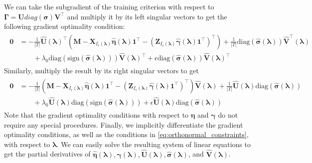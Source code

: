 \documentclass[12pt,letterpaper]{article}
\begin{document}
We can take the subgradient of the training criterion with respect to $\boldsymbol{\Gamma} = \boldsymbol{U} diag(\boldsymbol{\sigma}) \boldsymbol{V}^\top$ and multiply it by its left singular vectors to get the following gradient optimality condition:
\begin{align}
\begin{split}
\boldsymbol{0} & = 
- \frac{1}{|T|} 
\hat{\boldsymbol{U}}(\boldsymbol{\lambda})^\top
\left (
\boldsymbol{M} 
- \boldsymbol{X}_{I_r(\boldsymbol{\lambda})} \hat{\boldsymbol{\eta}}(\boldsymbol{\lambda}) \boldsymbol{1}^\top 
- (\boldsymbol{Z}_{I_c(\boldsymbol{\lambda})} \hat{\boldsymbol{\gamma}}(\boldsymbol{\lambda})  \boldsymbol{1}^\top )^\top
\right )
+ \frac{1}{|T|} \text{diag}(\hat{\boldsymbol{\sigma}}(\boldsymbol{\lambda})) \hat{\boldsymbol{V}}^\top(\boldsymbol{\lambda})
\\
& \qquad + \lambda_0 \text{diag}(\text{sign}(\hat{\boldsymbol{\sigma}}(\boldsymbol{\lambda}))) \hat{\boldsymbol{V}}(\boldsymbol{\lambda})^\top
+ \epsilon \text{diag}(\hat{\boldsymbol{\sigma}}(\boldsymbol{\lambda})) \hat{\boldsymbol{V}}(\boldsymbol{\lambda})^\top
\end{split}
\label{eq:grad_opt_matrix_left}
\end{align}
Similarly, multiply the result by its right singular vectors to get
\begin{align}
\begin{split}
\boldsymbol{0} & = - \frac{1}{|T|} 
\left (
\boldsymbol{M} 
- \boldsymbol{X}_{I_r(\boldsymbol{\lambda})} \hat{\boldsymbol{\eta}}(\boldsymbol{\lambda}) \boldsymbol{1}^\top 
- (\boldsymbol{Z}_{I_c(\boldsymbol{\lambda})} \hat{\boldsymbol{\gamma}}(\boldsymbol{\lambda})  \boldsymbol{1}^\top )^\top
\right )
\hat{\boldsymbol{V}}(\boldsymbol{\lambda})
+ \frac{1}{|T|} 
\hat{\boldsymbol{U}}(\boldsymbol{\lambda})
\text{diag}(\hat{\boldsymbol{\sigma}}(\boldsymbol{\lambda})) 
\\
& \qquad + \lambda_0 \hat{\boldsymbol{U}}(\boldsymbol{\lambda}) \text{diag}(\text{sign}(\hat{\boldsymbol{\sigma}}(\boldsymbol{\lambda})))
+ \epsilon \hat{\boldsymbol{U}}(\boldsymbol{\lambda}) \text{diag}(\hat{\boldsymbol{\sigma}}(\boldsymbol{\lambda}))
\end{split}
\label{eq:grad_opt_matrix_comp}
\end{align}
Note that the gradient optimality conditions with respect to $\boldsymbol{\eta}$ and $\boldsymbol{\gamma}$ do not require any special procedures. Finally, we implicitly differentiate the gradient optimality conditions, as well as the conditions in \eqref{eq:orthonormal_constraints}, with respect to $\boldsymbol{\lambda}$. We can easily solve the resulting system of linear equations to get the partial derivatives of 
$\hat{\boldsymbol{\eta}}(\boldsymbol{\lambda}), \hat{\boldsymbol{\gamma}}(\boldsymbol{\lambda}), 
\hat{\boldsymbol{U}}(\boldsymbol{\lambda}), 
\hat{\boldsymbol{\sigma}}(\boldsymbol{\lambda})$, and  
$\hat{\boldsymbol{V}}(\boldsymbol{\lambda})$.
\end{document}
